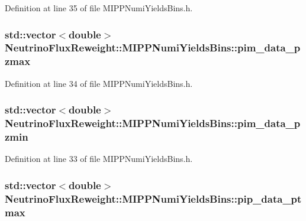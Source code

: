 Definition at line 35 of file M\-I\-P\-P\-Numi\-Yields\-Bins.\-h.

\hypertarget{class_neutrino_flux_reweight_1_1_m_i_p_p_numi_yields_bins_aad61319f28e08168c4eabf6507987e29}{
\subsubsection[{pim\-\_\-data\-\_\-pzmax}]{\setlength{\rightskip}{0pt plus 5cm}std\-::vector$<$double$>$ Neutrino\-Flux\-Reweight\-::\-M\-I\-P\-P\-Numi\-Yields\-Bins\-::pim\-\_\-data\-\_\-pzmax}}\label{class_neutrino_flux_reweight_1_1_m_i_p_p_numi_yields_bins_aad61319f28e08168c4eabf6507987e29}


Definition at line 34 of file M\-I\-P\-P\-Numi\-Yields\-Bins.\-h.

\hypertarget{class_neutrino_flux_reweight_1_1_m_i_p_p_numi_yields_bins_a9702c80785cd8eec150cf8a6091192a7}{
\subsubsection[{pim\-\_\-data\-\_\-pzmin}]{\setlength{\rightskip}{0pt plus 5cm}std\-::vector$<$double$>$ Neutrino\-Flux\-Reweight\-::\-M\-I\-P\-P\-Numi\-Yields\-Bins\-::pim\-\_\-data\-\_\-pzmin}}\label{class_neutrino_flux_reweight_1_1_m_i_p_p_numi_yields_bins_a9702c80785cd8eec150cf8a6091192a7}


Definition at line 33 of file M\-I\-P\-P\-Numi\-Yields\-Bins.\-h.

\hypertarget{class_neutrino_flux_reweight_1_1_m_i_p_p_numi_yields_bins_a00b588132209a2d82ffef318273d451a}{
\subsubsection[{pip\-\_\-data\-\_\-ptmax}]{\setlength{\rightskip}{0pt plus 5cm}std\-::vector$<$double$>$ Neutrino\-Flux\-Reweight\-::\-M\-I\-P\-P\-Numi\-Yields\-Bins\-::pip\-\_\-data\-\_\-ptmax}}\label{class_neutrino_flux_reweight_1_1_m_i_p_p_numi_yields_bins_a00b588132209a2d82ffef318273d451a}



